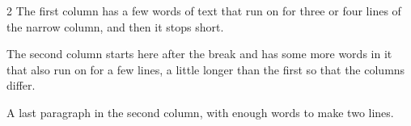 \documentclass{article}
\begin{document}
\begin{multicols}{2}
The first column has a few words of text that run on for three or four lines of the narrow column, and then it stops short.

\vfill\columnbreak

The second column starts here after the break and has some more words in it that also run on for a few lines, a little longer than the first so that the columns differ.

A last paragraph in the second column, with enough words to make two lines.
\end{multicols}
\end{document}
